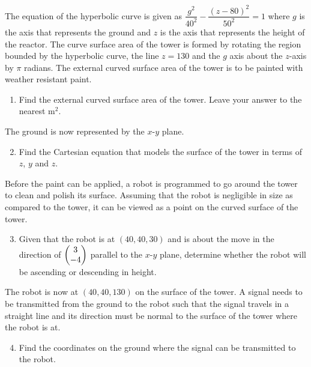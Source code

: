 \documentclass{echw}
\begin{document}
        The equation of the hyperbolic curve is given as $\dfrac{g^2}{40^2} - \dfrac{(z-80)^2}{50^2} = 1$ where $g$ is the axis that represents the ground and $z$ is the axis that represents the height of the reactor. The curve surface area of the tower is formed by rotating the region bounded by the hyperbolic curve, the line $z = 130$ and the $g$ axis about the $z$-axis by $\pi$ radians. The external curved surface area of the tower is to be painted with weather resistant paint.

        \begin{enumerate}
            \item Find the external curved surface area of the tower. Leave your answer to the nearest m$^2$.
        \end{enumerate}

        The ground is now represented by the $x$-$y$ plane.

        \begin{enumerate}
            \setcounter{enumi}{1}
            \item Find the Cartesian equation that models the surface of the tower in terms of $z$, $y$ and $z$.
        \end{enumerate}

        Before the paint can be applied, a robot is programmed to go around the tower to clean and polish its surface. Assuming that the robot is negligible in size as compared to the tower, it can be viewed as a point on the curved surface of the tower.

        \begin{enumerate}
            \setcounter{enumi}{2}
            \item Given that the robot is at $(40, 40, 30)$ and is about the move in the direction of $\begin{pmatrix} 3 \\ -4 \end{pmatrix}$ parallel to the $x$-$y$ plane, determine whether the robot will be ascending or descending in height.
        \end{enumerate}

        The robot is now at $(40, 40, 130)$ on the surface of the tower. A signal needs to be transmitted from the ground to the robot such that the signal travels in a straight line and its direction must be normal to the surface of the tower where the robot is at.

        \begin{enumerate}
            \setcounter{enumi}{3}
            \item Find the coordinates on the ground where the signal can be transmitted to the robot.
        \end{enumerate}
\end{document}
